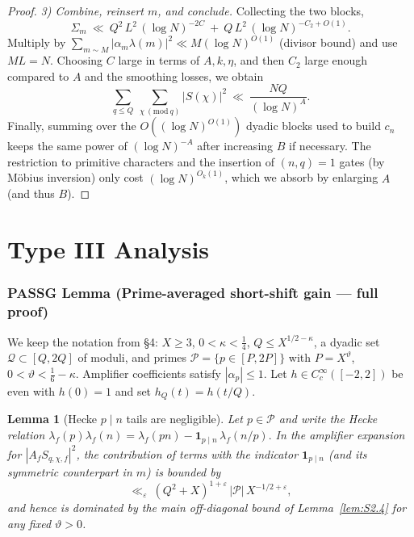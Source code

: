 \documentclass[11pt]{article}
\newtheorem{lemma}{Lemma}[part]
\theoremstyle{definition}
\theoremstyle{remark}
\numberwithin{equation}{part}
\begin{document}
\begin{proof}
	\smallskip
	\noindent\emph{3) Combine, reinsert $m$, and conclude.}
	Collecting the two blocks,
	\[
		\Sigma_m\ \ll\ Q^2\,L^2\,(\log N)^{-2C}\ +\ Q\,L^2\,(\log N)^{-C_2+O(1)}.
	\]
	Multiply by $\sum_{m\sim M} |\alpha_m\lambda(m)|^2\ll M(\log N)^{O(1)}$ (divisor bound) and use $ML=N$. Choosing $C$ large in terms of $A,k,\eta$, and then $C_2$ large enough compared to $A$ and the smoothing losses, we obtain
	\[
		\sum_{q\le Q}\ \sum_{\chi\ (\mathrm{mod}\ q)} |S(\chi)|^2
		\ \ll\ \frac{NQ}{(\log N)^{A}}.
	\]
	Finally, summing over the $O((\log N)^{O(1)})$ dyadic blocks used to build $c_n$ keeps the same power of $(\log N)^{-A}$ after increasing $B$ if necessary. The restriction to primitive characters and the insertion of $(n,q)=1$ gates (by Möbius inversion) only cost $(\log N)^{O_k(1)}$, which we absorb by enlarging $A$ (and thus $B$).
\end{proof}



\part{Type III Analysis}

\section{PASSG Lemma (Prime-averaged short-shift gain — full proof)}

We keep the notation from §4: $X\ge 3$, $0<\kappa<\tfrac14$, $Q\le X^{1/2-\kappa}$, a dyadic set $\mathcal Q\subset[Q,2Q]$ of moduli, and primes $\mathcal P=\{p\in[P,2P]\}$ with $P=X^\vartheta$, $0<\vartheta<\tfrac16-\kappa$. Amplifier coefficients satisfy $|\alpha_p|\le 1$. Let $h\in C_c^\infty([-2,2])$ be even with $h(0)=1$ and set $h_Q(t)=h(t/Q)$.

\begin{lemma}[Hecke $p\mid n$ tails are negligible]\label{lem:hecke-tails}
	Let $p\in\mathcal P$ and write the Hecke relation
	\(
	\lambda_f(p)\lambda_f(n)=\lambda_f(pn)-\mathbf 1_{p\mid n}\,\lambda_f(n/p).
	\)
	In the amplifier expansion for $|A_f S_{q,\chi,f}|^2$,
	the contribution of terms with the indicator $\mathbf 1_{p\mid n}$ (and its symmetric counterpart in $m$)
	is bounded by
	\[
		\ll_\varepsilon\ (Q^2+X)^{1+\varepsilon}\,|\mathcal P|\,X^{-1/2+\varepsilon},
	\]
	and hence is dominated by the main off-diagonal bound of Lemma~\ref{lem:S2.4} for any fixed $\vartheta>0$.
\end{lemma}
\end{document}
